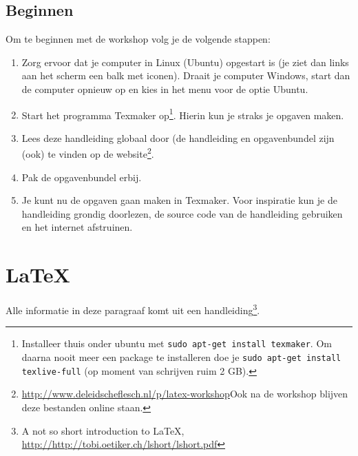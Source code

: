 
\subsection{Beginnen}

Om te beginnen met de workshop volg je de volgende stappen:
\begin{enumerate}
\item Zorg ervoor dat je computer in Linux (Ubuntu) opgestart is (je ziet dan links aan het scherm een balk met iconen). Draait je computer Windows, start dan de computer opnieuw op en kies in het menu voor de optie Ubuntu.
\item Start het programma Texmaker op\footnote{Installeer thuis onder ubuntu met \texttt{sudo apt-get install texmaker}. Om daarna nooit meer een package te installeren doe je \texttt{sudo apt-get install texlive-full} (op moment van schrijven ruim 2 GB).}. Hierin kun je straks je opgaven maken.
\item Lees deze handleiding globaal door (de handleiding en opgavenbundel zijn (ook) te vinden op de website\footnote{\url{http://www.deleidscheflesch.nl/p/latex-workshop}\newline Ook na de workshop blijven deze bestanden online staan.}. 
\item Pak de opgavenbundel erbij.
\item Je kunt nu de opgaven gaan maken in Texmaker. Voor inspiratie kun je de handleiding grondig doorlezen, de source code van de handleiding gebruiken en het internet afstruinen.
\end{enumerate}

\section{\LaTeX}

Alle informatie in deze paragraaf komt uit een handleiding\footnote{A not so
short introduction to \LaTeX,
\url{http://http://tobi.oetiker.ch/lshort/lshort.pdf}}.


